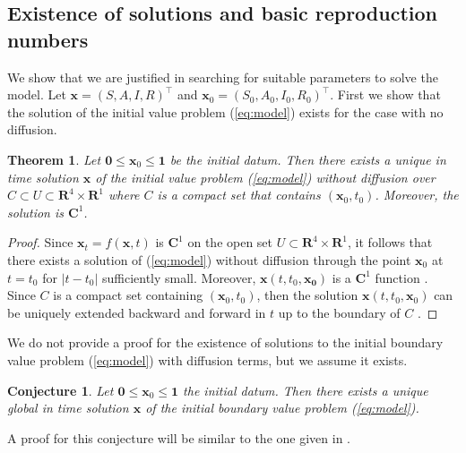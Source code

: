 \documentclass[11pt]{article}
\newcommand{\R}{\mathbf{R}}
\newcommand{\C}{\mathbf{C}}
\renewcommand\vec{\mathbf}
\newtheorem{theorem}{Theorem}
\newtheorem{conjecture}{Conjecture}
\begin{document}
	\subsection{Existence of solutions and basic reproduction numbers}
		We show that we are justified in searching for suitable parameters to solve the model.
		Let $\vec{x} = (S, A, I, R)^\intercal$ and $\vec{x}_0 = (S_0, A_0, I_0, R_0)^\intercal$.
		First we show that the solution of the initial value problem (\ref{eq:model}) exists for the case with no diffusion.
		\begin{theorem}
			Let $\vec{0} \leq \vec{x}_0 \leq \vec{1}$ be the initial datum.
			Then there exists a unique in time solution $\vec{x}$ of the initial value problem (\ref{eq:model}) without diffusion over $C \subset U \subset \R^4 \times \R^1$ where $C$ is a compact set that contains $(\vec{x}_0, t_0)$.
			Moreover, the solution is $\C^1$.
		\end{theorem}
		\begin{proof}
			Since $\vec{x}_t = f(\vec{x},t)$ is $\C^1$ on the open set $U \subset \R^4 \times \R^1$, it follows that there exists a solution of (\ref{eq:model}) without diffusion through the point $\vec{x}_0$ at $t = t_0$ for $|t - t_0|$ sufficiently small.
			Moreover, $\vec{x} (t, t_0,\vec{x_0})$ is a $\C^1$ function \cite{dynamics}.
			Since $C$ is a compact set containing $(\vec{x}_0, t_0)$, then the solution $\vec{x} (t, t_0, \vec{x}_0)$ can be uniquely extended backward and forward in $t$ up to the boundary of $C$ \cite{dynamics}.
		\end{proof}
		\noindent We do not provide a proof for the existence of solutions to the initial boundary value problem (\ref{eq:model}) with diffusion terms, but we assume it exists.
		\begin{conjecture}
			Let $\vec{0} \leq \vec{x}_0 \leq \vec{1}$ the initial datum.
			Then there exists a unique global in time solution $\vec{x}$ of the initial boundary value problem (\ref{eq:model}).
		\end{conjecture}
		\noindent A proof for this conjecture will be similar to the one given in \cite{Mammeri+2020+102+113}.
		
\end{document}
